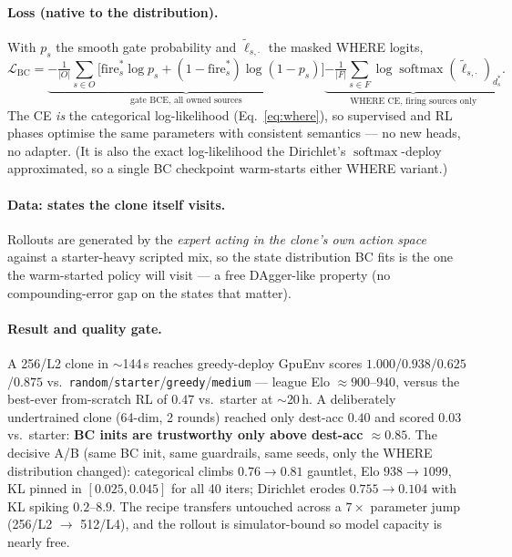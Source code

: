 \documentclass[11pt]{article}
\newcommand{\softmax}{\operatorname{softmax}}
\newcommand{\cd}[1]{\texttt{#1}}
\begin{document}
\paragraph{Loss (native to the distribution).} With $p_s$ the smooth gate probability and
$\tilde\ell_{s,\cdot}$ the masked WHERE logits,
\[
\mathcal L_{\mathrm{BC}}
=\underbrace{-\tfrac1{|O|}\sum_{s\in O}\big[\text{fire}^\ast_s\log p_s+(1{-}\text{fire}^\ast_s)\log(1{-}p_s)\big]}_{\text{gate BCE, all owned sources}}
\underbrace{-\tfrac1{|F|}\sum_{s\in F}\log\softmax(\tilde\ell_{s,\cdot})_{d^\ast_s}}_{\text{WHERE CE, firing sources only}} .
\]
The CE \emph{is} the categorical log-likelihood (Eq.~\eqref{eq:where}), so supervised and RL phases
optimise the same parameters with consistent semantics --- no new heads, no adapter. (It is also the exact
log-likelihood the Dirichlet's $\softmax$-deploy approximated, so a single BC checkpoint warm-starts
either WHERE variant.)

\paragraph{Data: states the clone itself visits.} Rollouts are generated by the \emph{expert acting in the
clone's own action space} against a starter-heavy scripted mix, so the state distribution BC fits is the
one the warm-started policy will visit --- a free DAgger-like property (no compounding-error gap on the
states that matter).

\paragraph{Result and quality gate.} A 256/L2 clone in $\sim$144\,s reaches greedy-deploy GpuEnv scores
$1.000$/$0.938$/$0.625$/$0.875$ vs.\ \cd{random}/\cd{starter}/\cd{greedy}/\cd{medium} --- league Elo
$\approx900$--$940$, versus the best-ever from-scratch RL of $0.47$ vs.\ starter at $\sim$20\,h. A
deliberately undertrained clone (64-dim, 2 rounds) reached only dest-acc $0.40$ and scored $0.03$ vs.\
starter: \textbf{BC inits are trustworthy only above dest-acc $\approx0.85$}. The decisive A/B (same BC
init, same guardrails, same seeds, only the WHERE distribution changed): categorical climbs
$0.76\to0.81$ gauntlet, Elo $938\to1099$, KL pinned in $[0.025,0.045]$ for all 40 iters; Dirichlet erodes
$0.755\to0.104$ with KL spiking $0.2$--$8.9$. The recipe transfers untouched across a $7\times$ parameter
jump (256/L2 $\to$ 512/L4), and the rollout is simulator-bound so model capacity is nearly free.
\end{document}
